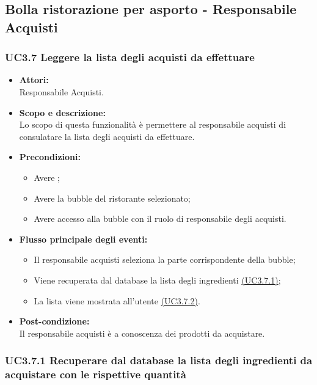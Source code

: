 \subsection{Bolla ristorazione per asporto - Responsabile Acquisti}

\subsubsection{UC3.7 Leggere la lista degli acquisti da effettuare} \label{UC3.7}

\begin{itemize}
	\item \textbf{Attori:}
	\\Responsabile Acquisti.
	\item \textbf{Scopo e descrizione:} 
	\\Lo scopo di questa funzionalità è permettere al responsabile acquisti di consulatare la lista degli acquisti da effettuare.
	\item \textbf{Precondizioni:}
	\begin{itemize}
		\item Avere ;
		\item Avere la bubble del ristorante selezionato;
		\item Avere accesso alla bubble con il ruolo di responsabile degli acquisti.
	\end{itemize}
	\item \textbf{Flusso principale degli eventi:}
	\begin{itemize}
		\item Il responsabile acquisti seleziona la parte corrispondente della bubble;
		\item Viene recuperata dal database la lista degli ingredienti \hyperref[UC3.7.1]{(UC3.7.1)};
		\item La lista viene mostrata all’utente \hyperref[UC3.7.2]{(UC3.7.2)}.
	\end{itemize}
	\item \textbf{Post-condizione:}
	\\Il responsabile acquisti è a conoscenza dei prodotti da acquistare.
\end{itemize}

\subsubsection{UC3.7.1 Recuperare dal database la lista degli ingredienti da acquistare con le rispettive quantità} \label{UC3.7.1}

